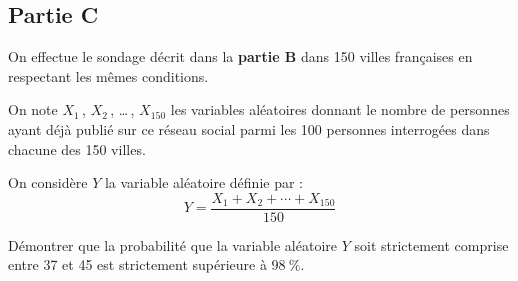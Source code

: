 \subsection*{Partie C}
On effectue le sondage décrit dans la \textbf{partie B} dans 150 villes françaises en respectant les mêmes conditions.

On note $X_{1}$\,, $X_{2}$\,, \ldots\,, $X_{150}$ les variables aléatoires donnant le nombre de personnes ayant déjà publié sur ce réseau social parmi les 100 personnes interrogées dans chacune des 150 villes.

On considère $Y$ la variable aléatoire définie par :
\[Y=\dfrac{X_{1}+X_{2}+\cdots+X_{150}}{150}\]

Démontrer que la probabilité que la variable aléatoire $Y$ soit strictement comprise entre 37 et 45 est strictement supérieure à $98~\%$.
